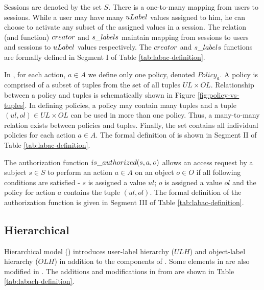 			


	
Sessions are denoted by the set $S$. There is a one-to-many mapping from users to sessions. While a user  may have many $uLabel$ values assigned to him, he can choose to activate any subset of the assigned values in a session. The relation (and function) $creator$ and $s\_labels$ maintain mapping from sessions to users and sessions to $uLabel$ values respectively.  The $creator$ and $s\_labels$ functions are formally defined in Segment I of Table \ref{tab:labac-definition}. 



In \eapABAC{}, for each action, $a \in A$ we define only one policy, denoted $Policy_a$. A policy is comprised of a subset of tuples from the set of all tuples $UL\times OL$. Relationship between a policy and tuples is schematically shown  in Figure \ref{fig:policy-vs-tuples}. In defining policies, a policy may contain many tuples and a tuple $(ul,ol) \in UL\times OL$ can be used in more than one policy. Thus, a many-to-many relation exists between policies and tuples. Finally, the set \textit{\Policy} contains all individual policies for each action $a \in A$. The formal definition of \textit{\Policy{}} is shown in Segment II of Table \ref{tab:labac-definition}.

The authorization function $is\_authorized(s, a, o)$ allows  an access request by a  subject $s \in S$ to perform an action $a \in A$ on an object $o \in O$ if all following conditions are satisfied - $s$ is assigned a value $ul$;  $o$ is assigned a value $ol$ and the policy for action $a$ contains the tuple $(ul,ol)$. The formal definition of the authorization function is given in Segment III of Table \ref{tab:labac-definition}.


	
		

		
	
	
	\subsection{Hierarchical \eapABAC{}}
	Hierarchical \eapABAC{} model (\hlabac ) introduces user-label hierarchy ($ULH$) and object-label hierarchy ($OLH$) in addition to the components of \clabac{}. Some elements in \clabac{} are also modified in \hlabac{}. The additions and modifications in \hlabac{} from \clabac{} are shown in Table \ref{tab:labach-definition}.
	
